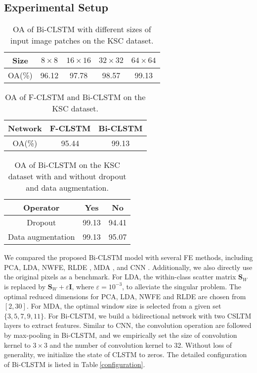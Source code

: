 \documentclass[12pt,onecolumn]{IEEEtran}
\begin{document}
\begin{spacing}{2}
\subsection{Experimental Setup}
\begin{table}\small
\centering
\caption{OA of Bi-CLSTM with different sizes of input image patches on the KSC dataset.}
\label{Size}
\begin{tabular}{|c|c|c|c|c|}
\hline
Size  &  $8\times8$      &$16\times16$         &$32\times32$      &$64\times64$           \\ \hline
OA(\%)           & 96.12            & 97.78              &98.57	             &99.13                 \\ \hline
\end{tabular}
\end{table}

\begin{table}\small
\centering
\caption{OA of F-CLSTM and Bi-CLSTM on the KSC dataset.}
\label{F_Bi}
\begin{tabular}{|c|c|c|}
\hline
Network  &  F-CLSTM                     & Bi-CLSTM           \\ \hline
OA(\%)    & 95.44                    & 99.13            \\ \hline
\end{tabular}
\end{table}

\begin{table}\small
\centering
\caption{OA of Bi-CLSTM on the KSC dataset with and without dropout and data augmentation.}
\label{dropout}
\begin{tabular}{|c|c|c|}
\hline
Operator          &  Yes                     & No           \\ \hline
Dropout           & 99.13                    & 94.41            \\ \hline
Data augmentation & 99.13                    & 95.07            \\ \hline
\end{tabular}
\end{table}
We compared the proposed Bi-CLSTM model with several FE methods, including PCA, LDA, NWFE, RLDE \cite{Zhou2015Dimension}, MDA \cite{Hang2015Matrix}, and CNN \cite{Chen2016Deep} . Additionally, we also directly use the original pixels as a benchmark. For LDA, the within-class scatter matrix $\mathbf{S}_{W}$ is replaced by $\mathbf{S}_{W}+\varepsilon\mathbf{I}$, where $\varepsilon=10^{-3}$, to alleviate the singular problem. The optimal reduced dimensions for PCA, LDA, NWFE and RLDE are chosen from $[2,30]$. For MDA, the optimal window size is selected from a given set $\{3,5,7,9,11\}$. For Bi-CLSTM, we build a bidirectional network with two CSLTM layers to extract features. Similar to CNN, the convolution operation are followed by max-pooling in Bi-CLSTM, and we empirically set the size of convolution kernel to $3\times3$ and the number of convolution kernel to 32. Without loss of generality, we initialize the state of CLSTM to zeros. The detailed configuration of Bi-CLSTM is listed in Table$~$\ref{configuration}.



\end{spacing}
\end{document}
